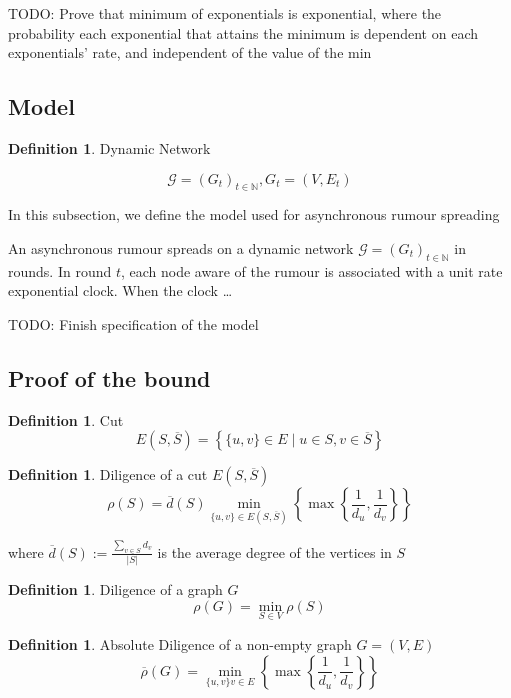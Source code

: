\documentclass[a4paper,11pt]{article}
\theoremstyle{definition}
\newtheorem{definition}[theorem]{Definition}
\newcommand*\comp[1]{\overline{#1}}
\begin{document}
TODO: Prove that minimum of exponentials is exponential, where the probability each exponential that attains the minimum is dependent on each exponentials' rate, and independent of the value of the min


\newcommand{\ModelIntro}{
	Let $\mathcal{G} = (G_t)_{t \in \mathbb{N}}$ be an $n$-node dynamic network, where one node is aware of a rumour in $G_0$.
}

\subsection{Model}

\begin{definition}
	Dynamic Network

	$$
		\mathcal{G} = (G_t)_{t \in \mathbb{N}}, G_t = (V, E_t)
	$$
\end{definition}


In this subsection, we define the model used for asynchronous rumour spreading


An asynchronous rumour spreads on a dynamic network $\mathcal{G} = (G_t)_{t\in \mathbb{N}}$ in rounds. In round $t$, each node aware of the rumour is associated with a unit rate exponential clock. When the clock \dots

TODO: Finish specification of the model

\subsection{Proof of the bound}

\begin{definition}
	Cut
	$$
		E(S, \comp{S}) = \left\{\{u, v\} \in E \mid u \in S, v \in \comp{S} \right\}
	$$
\end{definition}

\begin{definition}
	Diligence of a cut $ E(S, \comp{S}) $
	$$
		\rho(S) = \comp{d}(S) \min_{\{u, v\} \in E(S, \comp{S}) } \left\{ \max \left\{ \frac{1}{d_u},\frac{1}{d_v} \right\} \right\}
	$$ 

	where $\comp{d}(S) := \frac{\sum_{v \in S} d_v}{|S|}$ is the average degree of the vertices in $S$
\end{definition}

\begin{definition}
	Diligence of a graph $G$
	$$
		\rho(G) = \min_{S \in V} \rho(S) 
	$$
\end{definition}

\begin{definition}
	Absolute Diligence of a non-empty graph $G = (V, E)$
	$$
		\comp{\rho}(G) = \min_{\{u, v\}v \in E}\left\{ \max \left\{ \frac{1}{d_u},\frac{1}{d_v} \right\} \right\}
	$$
\end{definition}
\end{document}
